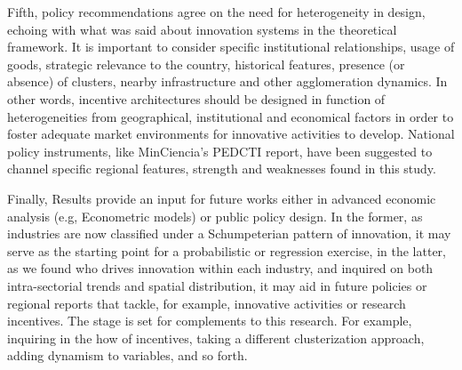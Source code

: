 \documentclass[12pt,a4paper]{article}
\begin{document}
Fifth, policy recommendations agree on the need for heterogeneity in design, echoing with what was said about innovation systems in the theoretical framework. It is important to consider specific institutional relationships, usage of goods, strategic relevance to the country, historical features, presence (or absence) of clusters, nearby infrastructure and other agglomeration dynamics. In other words, incentive architectures should be designed in function of heterogeneities from geographical, institutional and economical factors in order to foster adequate market environments for innovative activities to develop. National policy instruments, like MinCiencia's PEDCTI report, have been suggested to channel specific regional features, strength and weaknesses found in this study. 

Finally, Results provide an input for future works either in advanced economic analysis (e.g, Econometric models) or public policy design. In the former, as industries are now classified under a Schumpeterian pattern of innovation, it may serve as the starting point for a probabilistic or regression exercise, in the latter, as we found who drives innovation within each industry, and inquired on both intra-sectorial trends and spatial distribution, it may aid in future policies or regional reports that tackle, for example, innovative activities or research incentives. The stage is set for complements to this research. For example, inquiring in the how of incentives, taking a different clusterization approach, adding dynamism to variables, and so forth. 


\pagebreak
\end{document}
